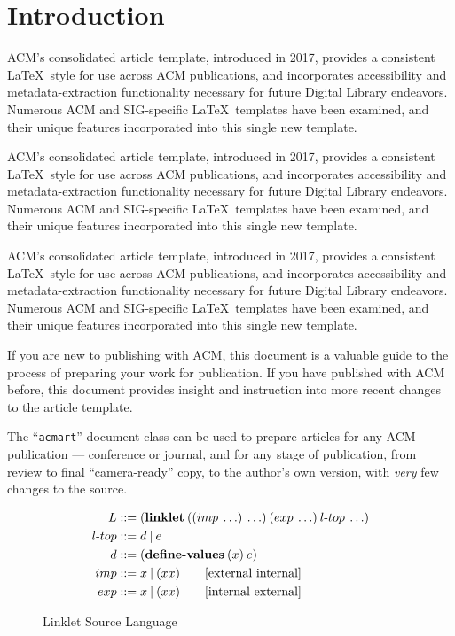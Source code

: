\documentclass[sigplan,screen,anonymous]{acmart}
\def\dash {\text{-}}
\begin{document}
%
\maketitle

\section{Introduction}
ACM's consolidated article template, introduced in 2017, provides a consistent \LaTeX\ style for use across ACM publications, and incorporates accessibility and metadata-extraction functionality necessary for future Digital Library endeavors. Numerous ACM and SIG-specific \LaTeX\ templates have been examined, and their unique features incorporated into this single new template.

ACM's consolidated article template, introduced in 2017, provides a consistent \LaTeX\ style for use across ACM publications, and incorporates accessibility and metadata-extraction functionality necessary for future Digital Library endeavors. Numerous ACM and SIG-specific \LaTeX\ templates have been examined, and their unique features incorporated into this single new template.

ACM's consolidated article template, introduced in 2017, provides a consistent \LaTeX\ style for use across ACM publications, and incorporates accessibility and metadata-extraction functionality necessary for future Digital Library endeavors. Numerous ACM and SIG-specific \LaTeX\ templates have been examined, and their unique features incorporated into this single new template.


If you are new to publishing with ACM, this document is a valuable guide to the process of preparing your work for publication. If you have published with ACM before, this document provides insight and instruction into more recent changes to the article template.

The ``\verb|acmart|'' document class can be used to prepare articles for any ACM publication --- conference or journal, and for any stage of publication, from review to final ``camera-ready'' copy, to the author's own version, with {\it very} few changes to the source.

\begin{figure}[tbp]
  \begin{align*}
    L  &::= (\textbf{linklet}\:((imp\: \ldots)\: \ldots)\:(exp\: \ldots)\:l\dash top\:\ldots)\\
    l\dash top &::= d\:|\:e \\
    d &::= (\textbf{define\dash values}\:(x)\:e) \\
    imp &::= x\:|\:(x x) \tag*{[external internal]}\\
    exp &::= x\:|\:(x x) \tag*{[internal external]}
  \end{align*}
  \caption{Linklet Source Language}
  \label{fig:linklet-source}
\end{figure}
\end{document}
